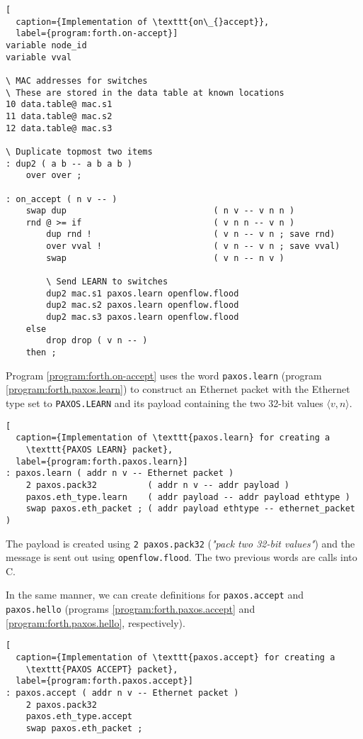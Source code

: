 \begin{lstlisting}[
  caption={Implementation of \texttt{on\_{}accept}},
  label={program:forth.on-accept}]
variable node_id
variable vval

\ MAC addresses for switches
\ These are stored in the data table at known locations
10 data.table@ mac.s1
11 data.table@ mac.s2
12 data.table@ mac.s3

\ Duplicate topmost two items
: dup2 ( a b -- a b a b )
    over over ;

: on_accept ( n v -- )
    swap dup                             ( n v -- v n n )
    rnd @ >= if                          ( v n n -- v n )
        dup rnd !                        ( v n -- v n ; save rnd)
        over vval !                      ( v n -- v n ; save vval)
        swap                             ( v n -- n v )

        \ Send LEARN to switches
        dup2 mac.s1 paxos.learn openflow.flood
        dup2 mac.s2 paxos.learn openflow.flood
        dup2 mac.s3 paxos.learn openflow.flood
    else
        drop drop ( v n -- )
    then ;
\end{lstlisting}

Program \ref{program:forth.on-accept} 
uses the word \texttt{paxos.learn} (program \ref{program:forth.paxos.learn})
to construct an Ethernet packet with the
Ethernet type set to \texttt{PAXOS.LEARN} and its payload containing the two
32-bit values $\langle v, n \rangle$.

\begin{lstlisting}[
  caption={Implementation of \texttt{paxos.learn} for creating a
    \texttt{PAXOS LEARN} packet},
  label={program:forth.paxos.learn}]
: paxos.learn ( addr n v -- Ethernet packet )
    2 paxos.pack32          ( addr n v -- addr payload )
    paxos.eth_type.learn    ( addr payload -- addr payload ethtype )
    swap paxos.eth_packet ; ( addr payload ethtype -- ethernet_packet )
\end{lstlisting}

The payload is created using
\texttt{2 paxos.pack32} (\textit{"pack two 32-bit values"}) and the message
is sent out using \texttt{openflow.flood}.  The two previous words are calls
into C.

In the same manner, we can create definitions for \texttt{paxos.accept} and
\texttt{paxos.hello} (programs \ref{program:forth.paxos.accept} and
\ref{program:forth.paxos.hello}, respectively).

\begin{lstlisting}[
  caption={Implementation of \texttt{paxos.accept} for creating a
    \texttt{PAXOS ACCEPT} packet},
  label={program:forth.paxos.accept}]
: paxos.accept ( addr n v -- Ethernet packet )
    2 paxos.pack32
    paxos.eth_type.accept
    swap paxos.eth_packet ;
\end{lstlisting}

